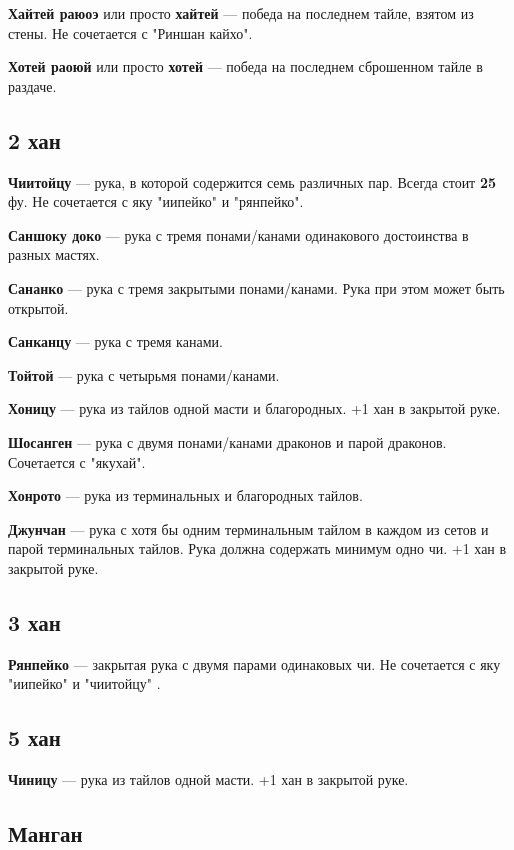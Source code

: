 \textbf{Хайтей раюоэ} или просто \textbf{хайтей} --- победа на последнем тайле, взятом из стены. Не сочетается с "Риншан кайхо".

\textbf{Хотей раоюй} или просто \textbf{хотей} --- победа на последнем сброшенном тайле в раздаче.

\subsection{2 хан}

\textbf{Чиитойцу} --- рука, в которой содержится семь различных пар. Всегда стоит \textbf{25} фу. Не сочетается с яку "иипейко" и "рянпейко".

\textbf{Саншоку доко} --- рука с тремя понами/канами одинакового достоинства в разных мастях.


\textbf{Сананко} --- рука с тремя закрытыми понами/канами. Рука при этом может быть открытой.

\textbf{Санканцу} --- рука с тремя канами.

\textbf{Тойтой} --- рука с четырьмя понами/канами.

\textbf{Хоницу} --- рука из тайлов одной масти и благородных. +1 хан в закрытой руке.

\textbf{Шосанген} --- рука с двумя понами/канами драконов и парой драконов. Сочетается с "якухай".

\textbf{Хонрото} --- рука из терминальных и благородных тайлов.

\textbf{Джунчан} --- рука с хотя бы одним терминальным тайлом в каждом из сетов и парой терминальных тайлов. Рука должна содержать минимум одно чи. +1 хан в закрытой руке.

\subsection{3 хан}

\textbf{Рянпейко} --- закрытая рука с двумя парами одинаковых чи. Не сочетается с яку "иипейко" и "чиитойцу" .


\subsection{5 хан}

\textbf{Чиницу} --- рука из тайлов одной масти. +1 хан в закрытой руке.

\subsection{Манган}

